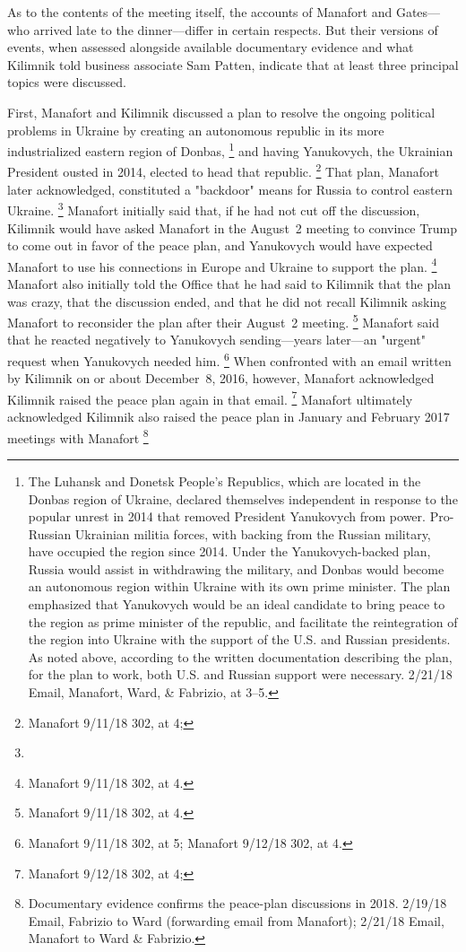 As to the contents of the meeting itself, the accounts of Manafort and Gates---who arrived late to the dinner---differ in certain respects.
But their versions of events, when assessed alongside available documentary evidence and what Kilimnik told business associate Sam Patten, indicate that at least three principal topics were discussed.

First, Manafort and Kilimnik discussed a plan to resolve the ongoing political problems in Ukraine by creating an autonomous republic in its more industrialized eastern region of Donbas,%
\footnote{The Luhansk and Donetsk People's Republics, which are located in the Donbas region of Ukraine, declared themselves independent in response to the popular unrest in 2014 that removed President Yanukovych from power.
Pro-Russian Ukrainian militia forces, with backing from the Russian military, have occupied the region since 2014.
Under the Yanukovych-backed plan, Russia would assist in withdrawing the military, and Donbas would become an autonomous region within Ukraine with its own prime minister.
The plan emphasized that Yanukovych would be an ideal candidate to bring peace to the region as prime minister of the republic, and facilitate the reintegration of the region into Ukraine with the support of the U.S. and Russian presidents.
As noted above, according to  the written documentation describing the plan, for the plan to work, both U.S. and Russian support were necessary.
 2/21/18 Email, Manafort, Ward, \& Fabrizio, at 3--5.}
and having Yanukovych, the Ukrainian President ousted in 2014, elected to head that republic.%
\footnote{Manafort 9/11/18 302, at 4; }
That plan, Manafort later acknowledged, constituted a "backdoor" means for Russia to control eastern Ukraine.%
\footnote{}
Manafort initially said that, if he had not cut off the discussion, Kilimnik would have asked Manafort in the August~2 meeting to convince Trump to come out in favor of the peace plan, and Yanukovych would have expected Manafort to use his connections in Europe and Ukraine to support the plan.%
\footnote{Manafort 9/11/18 302, at 4.}
Manafort also initially told the Office that he had said to Kilimnik that the plan was crazy, that the discussion ended, and that he did not recall Kilimnik asking Manafort to reconsider the plan after their August~2 meeting.%
\footnote{Manafort 9/11/18 302, at 4.}
Manafort said
that he reacted negatively to Yanukovych sending---years later---an "urgent" request when Yanukovych needed him.%
\footnote{ Manafort 9/11/18 302, at 5;
Manafort 9/12/18 302, at 4.}
When confronted with an email written by Kilimnik on or about December~8, 2016, however, Manafort acknowledged Kilimnik raised the peace plan again in that email.%
\footnote{Manafort 9/12/18 302, at 4; }
Manafort ultimately acknowledged Kilimnik also raised the peace plan in January and February 2017 meetings with Manafort
\footnote{ Documentary evidence confirms the peace-plan discussions in 2018.
2/19/18 Email, Fabrizio to Ward (forwarding email from Manafort);
2/21/18 Email, Manafort to Ward \& Fabrizio.}

